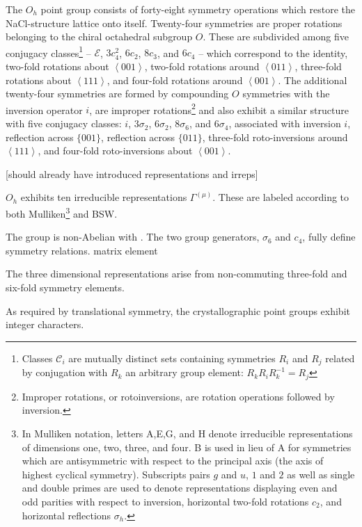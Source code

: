 \documentclass[twocolumn,showpacs,preprintnumbers,superscriptaddress,prb,floatfix,aps,10pt]{revtex4-1}
\newcommand*{\class}{\mathcal{C}}
\newcommand*{\id}{\mathcal{E}}
\begin{document}
The $O_h$ point group consists of forty-eight symmetry operations which restore the NaCl-structure lattice onto itself. Twenty-four symmetries are proper rotations belonging to the chiral octahedral subgroup $O$. These are subdivided among five conjugacy classes\footnote{Classes $\class_i$ are mutually distinct sets containing symmetries $R_i$ and $R_j$ related by conjugation with $R_k$ an arbitrary group element: $R_kR_iR_k^{-1}=R_j$} --  $\id$, $3c_4^2$, $6c_2$, $8c_3$, and $6c_4$ -- which correspond to the identity, two-fold rotations about $\left<001\right>$, two-fold rotations around $\left<011\right>$, three-fold rotations about $\left<111\right>$, and four-fold rotations around $\left<001\right>$. The additional twenty-four symmetries are formed by compounding $O$ symmetries with the inversion operator $i$, are improper rotations\footnote{Improper rotations, or rotoinversions, are rotation operations followed by inversion.} and also exhibit a similar structure with five conjugacy classes: $i$, $3\sigma_2$, $6\sigma_2$, $8\sigma_6$, and $6\sigma_4$, associated with inversion $i$, reflection across $\{001\}$, reflection across $\{011\}$, three-fold roto-inversions around $\left<111\right>$, and four-fold roto-inversions about $\left<001\right>$. 

[should already have introduced representations and irreps]

$O_h$ exhibits ten irreducible representations $\Gamma^{(\mu)}$. These are labeled according to both Mulliken\footnote{In Mulliken notation, letters A,E,G, and H denote irreducible representations of dimensions one, two, three, and four. B is used in lieu of A for symmetries which are antisymmetric with respect to the principal axis (the axis of highest cyclical symmetry). Subscripts pairs $g$ and $u$, $1$ and $2$ as well as single and double primes are used to denote representations displaying even and odd parities with respect to inversion, horizontal two-fold rotations $c_2$, and horizontal reflections $\sigma_h$.} and BSW.


The group is non-Abelian with . The two group generators, $\sigma_6$ and $c_4$, fully define symmetry relations.
matrix element 


The three dimensional representations arise from non-commuting three-fold and six-fold symmetry elements. 




As required by translational symmetry, the crystallographic point groups exhibit integer characters.
\end{document}
